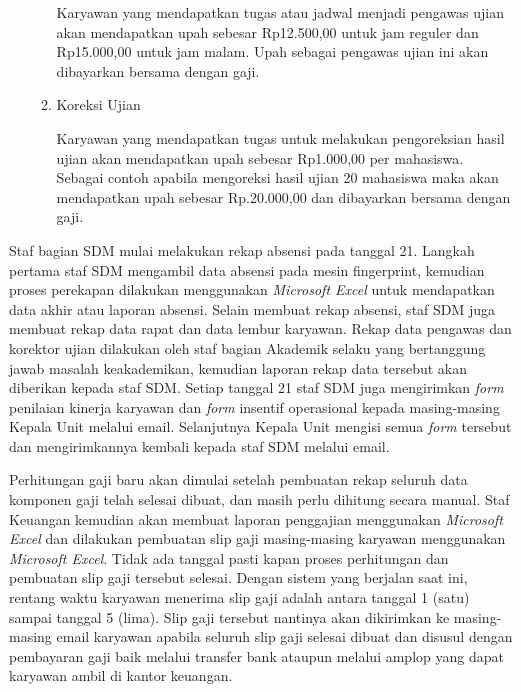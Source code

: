 \begin{enumerate}
\begin{enumerate}[label=\alph*.]
							Karyawan yang mendapatkan tugas atau jadwal menjadi pengawas ujian akan mendapatkan upah sebesar Rp12.500,00 untuk jam reguler dan Rp15.000,00 untuk jam malam. Upah sebagai pengawas ujian ini akan dibayarkan bersama dengan gaji. 
							\item Koreksi Ujian
							
							Karyawan yang mendapatkan tugas untuk melakukan pengoreksian hasil ujian akan mendapatkan upah sebesar Rp1.000,00 per mahasiswa. Sebagai contoh apabila mengoreksi hasil ujian 20 mahasiswa maka akan mendapatkan upah sebesar Rp.20.000,00 dan dibayarkan bersama dengan gaji.
						\end{enumerate}
				\end{enumerate}

				Staf bagian SDM mulai melakukan rekap absensi pada tanggal 21. Langkah pertama staf SDM mengambil data absensi pada mesin fingerprint, kemudian proses perekapan dilakukan menggunakan \emph{Microsoft Excel} untuk mendapatkan data akhir atau laporan absensi. Selain membuat rekap absensi, staf SDM juga membuat rekap data rapat dan data lembur karyawan. Rekap data pengawas dan korektor ujian dilakukan oleh staf bagian Akademik selaku yang bertanggung jawab masalah keakademikan, kemudian laporan rekap data tersebut akan diberikan kepada staf SDM. Setiap tanggal 21 staf SDM juga mengirimkan \emph{form} penilaian kinerja karyawan dan \emph{form} insentif operasional kepada masing-masing Kepala Unit melalui email. Selanjutnya Kepala Unit mengisi semua \emph{form} tersebut dan mengirimkannya kembali kepada staf SDM melalui email.

				Perhitungan gaji baru akan dimulai setelah pembuatan rekap seluruh data komponen gaji telah selesai dibuat, dan masih perlu dihitung secara manual. Staf Keuangan kemudian akan membuat laporan penggajian menggunakan \emph{Microsoft Excel} dan dilakukan pembuatan slip gaji masing-masing karyawan menggunakan \emph{Microsoft Excel}. Tidak ada tanggal pasti kapan proses perhitungan dan pembuatan slip gaji tersebut selesai. Dengan sistem yang berjalan saat ini, rentang waktu karyawan menerima slip gaji adalah antara tanggal 1 (satu) sampai tanggal 5 (lima). Slip gaji tersebut nantinya akan dikirimkan ke masing-masing email karyawan apabila seluruh slip gaji selesai dibuat dan disusul dengan pembayaran gaji baik melalui transfer bank ataupun melalui amplop yang dapat karyawan ambil di kantor keuangan. 

